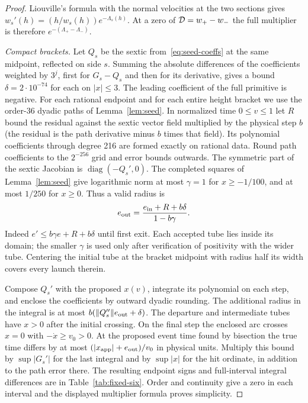 \begin{proof}
Liouville's formula with the normal velocities at the two sections
gives $w_s'(h)=(h/w_s(h))e^{-\Lambda_s(h)}$. At a zero of
$\mathcal{D}=w_+-w_-$ the full multiplier is therefore
$e^{-(\Lambda_+-\Lambda_-)}$.

\emph{Compact brackets.}
Let $Q_s$ be the sextic from~\eqref{eq:seed-coeffs} at the same midpoint,
reflected on side $s$. Summing the absolute differences of the
coefficients weighted by $3^j$, first for $G_s-Q_s$ and then for its
derivative, gives a bound $\delta=2\cdot10^{-74}$ for each on $|x|\le3$.
The leading coefficient of the full primitive is negative.
For each rational endpoint and for each entire height bracket we use
the order-36 dyadic paths of Lemma~\ref{lem:seed}. In normalized time
$0\le v\le1$ let $R$ bound the residual against the sextic vector
field multiplied by the physical step $b$ (the residual is the path
derivative minus $b$ times that field). Its polynomial coefficients
through degree 216 are formed exactly on rational data. Round path
coefficients to the $2^{-256}$ grid and error bounds outwards.
The symmetric part of the sextic Jacobian is
$\operatorname{diag}(-Q_s',0)$. The completed squares of
Lemma~\ref{lem:seed} give logarithmic norm at most $\gamma=1$ for
$x\ge-1/100$, and at most $1/250$ for $x\ge0$. Thus a valid radius is
\[
 e_{\rm out}=\frac{e_{\rm in}+R+b\delta}{1-b\gamma}.
\]
Indeed $e'\le b\gamma e+R+b\delta$ until first exit.
Each accepted tube lies inside its domain; the smaller $\gamma$ is
used only after verification of positivity with the wider tube.
Centering the initial tube at the bracket midpoint with radius half
its width covers every launch therein.

Compose $Q_s'$ with the proposed $x(v)$, integrate its polynomial
on each step, and enclose the coefficients by outward dyadic rounding.
The additional radius in the integral is at most
$b(\|Q_s''\|e_{\rm out}+\delta)$. The departure and intermediate
tubes have $x>0$ after the initial crossing. On the final step the
enclosed arc crosses $x=0$ with $-\dot x\ge v_0>0$. At the proposed
event time found by bisection the true time differs by at most
$(|x_{\rm app}|+e_{\rm out})/v_0$ in physical units. Multiply this
bound by $\sup|G_s'|$ for the last integral and by $\sup|x|$ for the
hit ordinate, in addition to the path error there. The resulting endpoint
signs and full-interval integral differences are in Table~\ref{tab:fixed-six}.
Order and continuity give a zero in each interval and the displayed
multiplier formula proves simplicity.


\end{proof}
